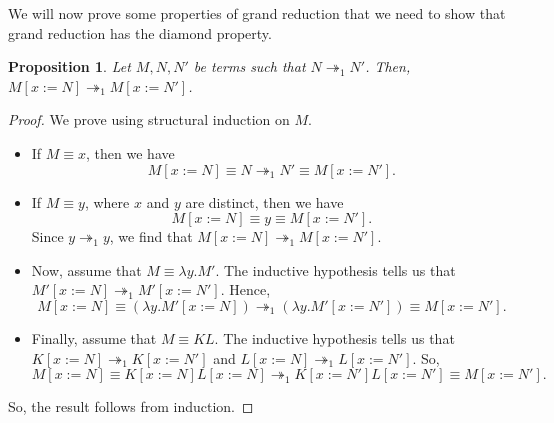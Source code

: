 \documentclass[a4paper, openany]{memoir}
\newtheorem{proposition}{Proposition}[section]
\theoremstyle{definition}
\begin{document}
    We will now prove some properties of grand reduction that we need to show that grand reduction has the diamond property.
    \begin{proposition}
        Let $M, N, N'$ be terms such that $N \twoheadrightarrow_1 N'$. Then, $M[x := N] \twoheadrightarrow_1 M[x := N']$.
    \end{proposition}
    \begin{proof}
        We prove using structural induction on $M$.
        \begin{itemize}
            \item If $M \equiv x$, then we have
            \[M[x := N] \equiv N \twoheadrightarrow_1 N' \equiv M[x := N'].\]

            \item If $M \equiv y$, where $x$ and $y$ are distinct, then we have
            \[M[x := N] \equiv y \equiv M[x:= N'].\]
            Since $y \twoheadrightarrow_1 y$, we find that $M[x := N] \twoheadrightarrow_1 M[x := N']$.

            \item Now, assume that $M \equiv \lambda y.M'$. The inductive hypothesis tells us that $M'[x := N] \twoheadrightarrow_1 M'[x := N']$. Hence, 
            \[M[x := N] \equiv (\lambda y.M' [x := N]) \twoheadrightarrow_1 (\lambda y.M' [x := N']) \equiv M [x := N'].\]

            \item Finally, assume that $M \equiv KL$. The inductive hypothesis tells us that $K[x := N] \twoheadrightarrow_1 K[x := N']$ and $L[x := N] \twoheadrightarrow_1 L[x := N']$. So,
            \[M[x:= N] \equiv K[x := N] L[x := N] \twoheadrightarrow_1 K[x := N'] L[x := N'] \equiv M[x := N'].\]
        \end{itemize}
        So, the result follows from induction.
    \end{proof}
\end{document}

